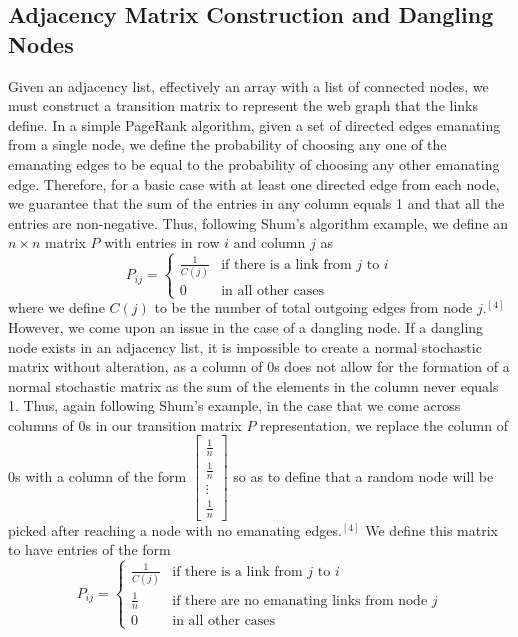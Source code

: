 \documentclass{article}
\begin{document}
    \subsection{Adjacency Matrix Construction and Dangling Nodes}
    Given an adjacency list, effectively an array with a list of connected nodes, we must construct a transition matrix to represent the web graph that the links define. In a simple PageRank algorithm, given a set of directed edges emanating from a single node, we define the probability of choosing any one of the emanating edges to be equal to the probability of choosing any other emanating edge. Therefore, for a basic case with at least one directed edge from each node, we guarantee that the sum of the entries in any column equals 1 and that all the entries are non-negative. Thus, following Shum's algorithm example, we define an $n \times n$ matrix $P$ with entries in row $i$ and column $j$ as
    \[ P_{ij} =
    \begin{cases} 
      \frac{1}{C(j)} & \text{if there is a link from $j$ to $i$} \\
      0 & \text{in all other cases}
   \end{cases}
    \]
    where we define $C(j)$ to be the number of total outgoing edges from node $j$.$^{[4]}$ However, we come upon an issue in the case of a dangling node. If a dangling node exists in an adjacency list, it is impossible to create a normal stochastic matrix without alteration, as a column of 0s does not allow for the formation of a normal stochastic matrix as the sum of the elements in the column never equals 1. Thus, again following Shum's example, in the case that we come across columns of 0s in our transition matrix $P$ representation, we replace the column of 0s with a column of the form $\begin{bmatrix} \frac{1}{n} \\ \frac{1}{n} \\ \vdots \\ \frac{1}{n} \end{bmatrix}$ so as to define that a random node will be picked after reaching a node with no emanating edges.$^{[4]}$ We define this matrix to have entries of the form
    \[ P_{ij} =
    \begin{cases} 
      \frac{1}{C(j)} & \text{if there is a link from $j$ to $i$} \\
      \frac{1}{n} & \text{if there are no emanating links from node $j$} \\
      0 & \text{in all other cases}
   \end{cases}
    \]
\end{document}
